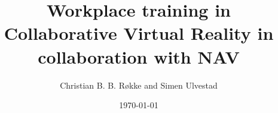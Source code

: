 \newcommand{\mytitle}{Workplace training in Collaborative Virtual Reality in collaboration with NAV}
\newcommand{\myauthor}{Christian B. B. Røkke and Simen Ulvestad}

\title{\mytitle}
\author{\myauthor}
\date{\today}